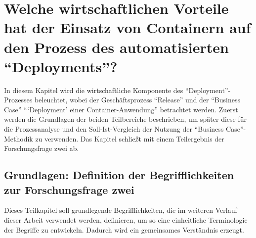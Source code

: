 \chapter[Forschungsfrage 2]{Welche wirtschaftlichen Vorteile hat der Einsatz von Containern auf den Prozess des automatisierten \enquote{Deployments}?} \label{ff2}
In diesem Kapitel wird die wirtschaftliche Komponente des \enquote{Deployment}-Prozesses beleuchtet, wobei der Geschäftsprozess \enquote{Release} und der \enquote{Business Case} \enquote{\enquote{Deployment} einer Container-Anwendung}  betrachtet werden. Zuerst werden die Grundlagen der beiden Teilbereiche beschrieben, um später diese für die Prozessanalyse und den Soll-Ist-Vergleich der Nutzung der \enquote{Business Case}-Methodik zu verwenden. Das Kapitel schließt mit einem Teilergebnis der Forschungsfrage zwei ab.

\section{Grundlagen: Definition der Begrifflichkeiten zur Forschungsfrage zwei}
Dieses Teilkapitel soll grundlegende Begrifflichkeiten, die im weiteren Verlauf dieser Arbeit verwendet werden, definieren, um so eine einheitliche Terminologie der Begriffe zu entwickeln. Dadurch wird ein gemeinsames Verständnis erzeugt.

